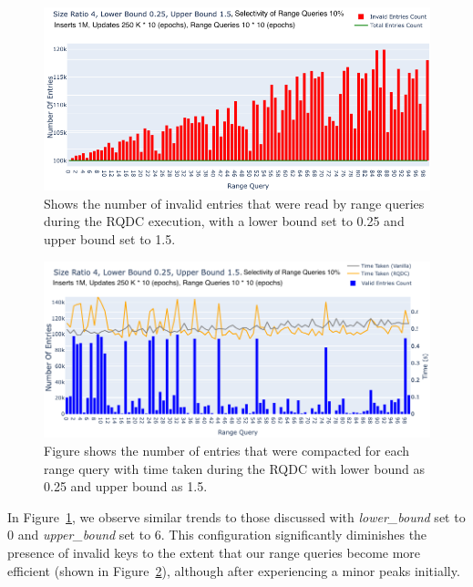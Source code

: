 \begin{figure}%
    \centering
    \includegraphics[scale=0.28]{Figures/epoch-experiment-size-ratio-4-lb-ub.png}
    \caption{Shows the number of invalid entries that were read by range queries during the RQDC execution, with a lower bound 
    set to 0.25 and upper bound set to 1.5.}\label{fig:another_epoch_with_lb_ub}
\end{figure}
\begin{figure}%
    \centering
    \includegraphics[scale=0.27]{Figures/epoch-experiment-size-ratio-4-rq-time-lb-ub.png}
    \caption{Figure shows the number of entries that were compacted for each range query with time taken during the RQDC 
    with lower bound as 0.25 and upper bound as 1.5.}\label{fig:range_queries_time}
\end{figure}

In Figure~\ref{fig:another_epoch_with_lb_ub}, we observe similar trends to those discussed with \textit{lower\_bound} 
set to 0 and \textit{upper\_bound} set to 6. This configuration significantly diminishes the presence of invalid keys to 
the extent that our range queries become more efficient (shown in Figure~\ref{fig:range_queries_time}), although after 
experiencing a minor peaks initially.

